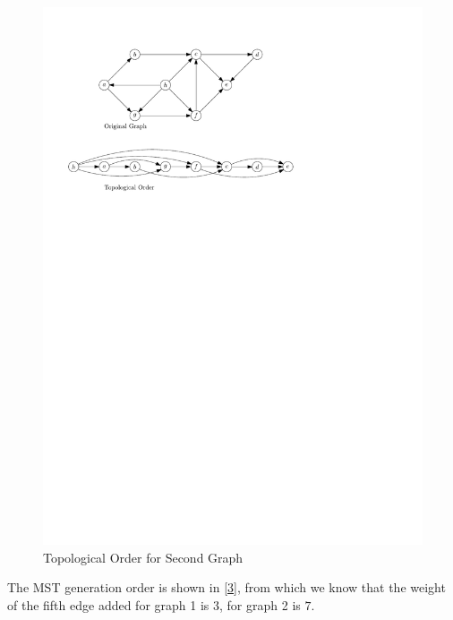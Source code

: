 \begin{homeworkProblem}
\begin{homeworkSubProblem}
    \begin{figure}[H]
        \caption{Topological Order for Second Graph}\label{2.b}
        \centering
        \includegraphics[width=.8\textwidth]{running2b}
    \end{figure}
\end{homeworkSubProblem}

\begin{homeworkSubProblem}
    The MST generation order is shown in \cref{3}, from which we know
    that the weight of the fifth edge added for graph 1 is $3$,
    for graph 2 is $7$.


\end{homeworkSubProblem}
\end{homeworkProblem}
